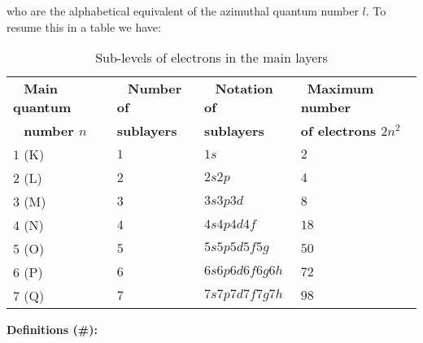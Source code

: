 	who are the alphabetical equivalent of the azimuthal quantum number $l$. To resume this in a table we have:
	\begin{table}[H]
		\begin{center}
		 \begin{tabular}{|m{4cm}|m{3.5cm}|m{3cm}|m{4.5cm}|}
		 \hline 
		 \centering\arraybackslash\ \cellcolor{black!30} \textbf{Main quantum} & \centering\arraybackslash\ \cellcolor{black!30} \textbf{Number of} & \centering\arraybackslash\ \cellcolor{black!30} \textbf{Notation of}  & \centering\arraybackslash\ \cellcolor{black!30}\textbf{Maximum number} \\ 
		 \centering\arraybackslash\ \cellcolor{black!30} \textbf{number $n$} & \centering  \cellcolor{black!30} \textbf{sublayers} & \centering  \cellcolor{black!30} \textbf{sublayers}  & \centering\arraybackslash \cellcolor{black!30}\textbf{of electrons $2n^2$} \\ 
		 \hline 
		 \centering\arraybackslash $1$ (K) &  \centering\arraybackslash $1$ & \centering\arraybackslash $1s$ &  \centering\arraybackslash $2$\\ \hline
		 \centering\arraybackslash $2$ (L) & \centering\arraybackslash $2$ & \centering\arraybackslash $2s2p$ & \centering\arraybackslash $4$\\
		 \centering\arraybackslash $3$ (M) &  \centering\arraybackslash $3$ & \centering\arraybackslash $3s3p3d$ &  \centering\arraybackslash $8$\\ \hline
		 \centering\arraybackslash $4$ (N) &  \centering\arraybackslash $4$ & \centering\arraybackslash $4s4p4d4f$ &  \centering\arraybackslash $18$\\ \hline
		 \centering\arraybackslash $5$ (O) &  \centering\arraybackslash $5$ & \centering\arraybackslash $5s5p5d5f5g$ &  \centering\arraybackslash $50$\\ \hline
		 \centering\arraybackslash $6$ (P) &  \centering\arraybackslash $6$ & \centering\arraybackslash $6s6p6d6f6g6h$ &  \centering\arraybackslash $72$\\ \hline
		 \centering\arraybackslash $7$ (Q) &  \centering\arraybackslash $7$ & \centering\arraybackslash $7s7p7d7f7g7h$ &  \centering\arraybackslash $98$\\ \hline
		 \end{tabular}
		\caption{Sub-levels of electrons in the main layers}
		\end{center}
	\end{table}
	\textbf{Definitions (\#\mydef):}
